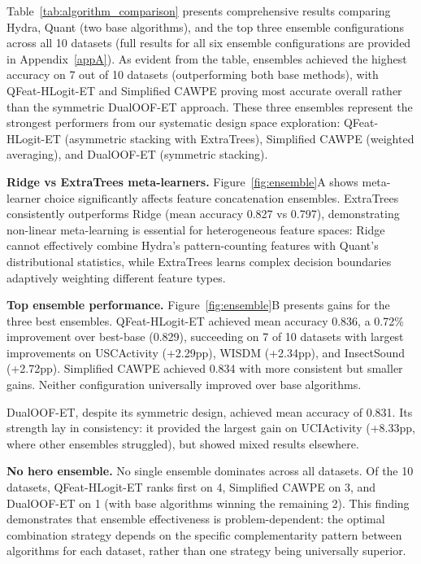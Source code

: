 \documentclass[pdflatex,sn-basic]{sn-jnl}           %
\theoremstyle{thmstyleone}%
\theoremstyle{thmstyletwo}%
\theoremstyle{thmstylethree}%
\begin{document}
Table~\ref{tab:algorithm_comparison} presents comprehensive results comparing Hydra, Quant (two base algorithms), and the top three ensemble configurations across all 10 datasets (full results for all six ensemble configurations are provided in Appendix~\ref{appA}). As evident from the table, ensembles achieved the highest accuracy on 7 out of 10 datasets (outperforming both base methods), with QFeat-HLogit-ET and Simplified CAWPE proving most accurate overall rather than the symmetric DualOOF-ET approach. These three ensembles represent the strongest performers from our systematic design space exploration: QFeat-HLogit-ET (asymmetric stacking with ExtraTrees), Simplified CAWPE (weighted averaging), and DualOOF-ET (symmetric stacking).



\textbf{Ridge vs ExtraTrees meta-learners.} Figure~\ref{fig:ensemble}A shows meta-learner choice significantly affects feature concatenation ensembles. ExtraTrees consistently outperforms Ridge (mean accuracy 0.827 vs 0.797), demonstrating non-linear meta-learning is essential for heterogeneous feature spaces: Ridge cannot effectively combine Hydra's pattern-counting features with Quant's distributional statistics, while ExtraTrees learns complex decision boundaries adaptively weighting different feature types.

\textbf{Top ensemble performance.} Figure~\ref{fig:ensemble}B presents gains for the three best ensembles. QFeat-HLogit-ET achieved mean accuracy 0.836, a 0.72\% improvement over best-base (0.829), succeeding on 7 of 10 datasets with largest improvements on USCActivity (+2.29pp), WISDM (+2.34pp), and InsectSound (+2.72pp). Simplified CAWPE achieved 0.834 with more consistent but smaller gains. Neither configuration universally improved over base algorithms.

DualOOF-ET, despite its symmetric design, achieved mean accuracy of 0.831. Its strength lay in consistency: it provided the largest gain on UCIActivity (+8.33pp, where other ensembles struggled), but showed mixed results elsewhere.

\textbf{No hero ensemble.} No single ensemble dominates across all datasets. Of the 10 datasets, QFeat-HLogit-ET ranks first on 4, Simplified CAWPE on 3, and DualOOF-ET on 1 (with base algorithms winning the remaining 2). This finding demonstrates that ensemble effectiveness is problem-dependent: the optimal combination strategy depends on the specific complementarity pattern between algorithms for each dataset, rather than one strategy being universally superior.
\end{document}
